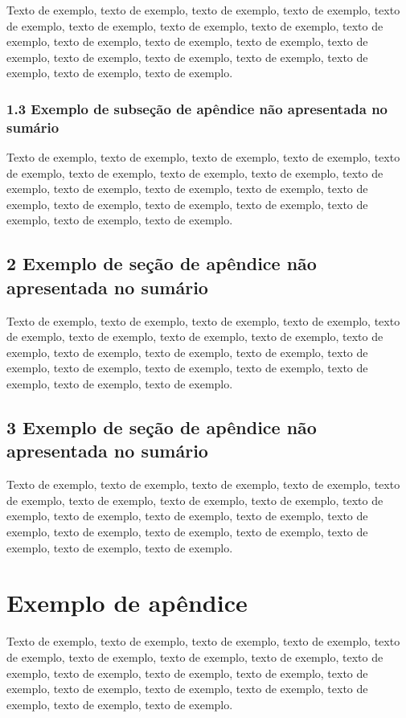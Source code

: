 \documentclass[
	12pt,				%
	oneside,			%
	a4paper,			%
	english,			%
	brazil				%
	]{abntex2ppgsi}
\begin{document}
\begin{apendicesenv}
Texto de exemplo, texto de exemplo, texto de exemplo, texto de exemplo, texto de exemplo, texto de exemplo, texto de exemplo, texto de exemplo, texto de exemplo, texto de exemplo, texto de exemplo, texto de exemplo, texto de exemplo, texto de exemplo, texto de exemplo, texto de exemplo, texto de exemplo, texto de exemplo, texto de exemplo.

\subsection*{1.3 Exemplo de subseção de apêndice não apresentada no sumário}

Texto de exemplo, texto de exemplo, texto de exemplo, texto de exemplo, texto de exemplo, texto de exemplo, texto de exemplo, texto de exemplo, texto de exemplo, texto de exemplo, texto de exemplo, texto de exemplo, texto de exemplo, texto de exemplo, texto de exemplo, texto de exemplo, texto de exemplo, texto de exemplo, texto de exemplo.

\section*{2 Exemplo de seção de apêndice não apresentada no sumário}

Texto de exemplo, texto de exemplo, texto de exemplo, texto de exemplo, texto de exemplo, texto de exemplo, texto de exemplo, texto de exemplo, texto de exemplo, texto de exemplo, texto de exemplo, texto de exemplo, texto de exemplo, texto de exemplo, texto de exemplo, texto de exemplo, texto de exemplo, texto de exemplo, texto de exemplo.

\section*{3 Exemplo de seção de apêndice não apresentada no sumário}

Texto de exemplo, texto de exemplo, texto de exemplo, texto de exemplo, texto de exemplo, texto de exemplo, texto de exemplo, texto de exemplo, texto de exemplo, texto de exemplo, texto de exemplo, texto de exemplo, texto de exemplo, texto de exemplo, texto de exemplo, texto de exemplo, texto de exemplo, texto de exemplo, texto de exemplo.


\chapter{Exemplo de apêndice}

Texto de exemplo, texto de exemplo, texto de exemplo, texto de exemplo, texto de exemplo, texto de exemplo, texto de exemplo, texto de exemplo, texto de exemplo, texto de exemplo, texto de exemplo, texto de exemplo, texto de exemplo, texto de exemplo, texto de exemplo, texto de exemplo, texto de exemplo, texto de exemplo, texto de exemplo.


\end{apendicesenv}
\end{document}
